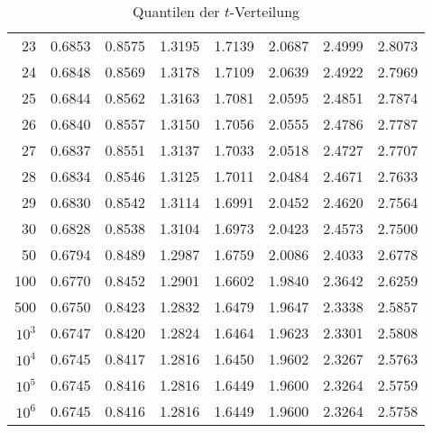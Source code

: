 \begin{table}[h]
\begin{center}
\begin{tabular}{|r|rrrrrrr|}
23&0.6853&0.8575&1.3195&1.7139&2.0687&2.4999&2.8073\\
24&0.6848&0.8569&1.3178&1.7109&2.0639&2.4922&2.7969\\
25&0.6844&0.8562&1.3163&1.7081&2.0595&2.4851&2.7874\\
26&0.6840&0.8557&1.3150&1.7056&2.0555&2.4786&2.7787\\
27&0.6837&0.8551&1.3137&1.7033&2.0518&2.4727&2.7707\\
28&0.6834&0.8546&1.3125&1.7011&2.0484&2.4671&2.7633\\
29&0.6830&0.8542&1.3114&1.6991&2.0452&2.4620&2.7564\\
30&0.6828&0.8538&1.3104&1.6973&2.0423&2.4573&2.7500\\
50&0.6794&0.8489&1.2987&1.6759&2.0086&2.4033&2.6778\\
100&0.6770&0.8452&1.2901&1.6602&1.9840&2.3642&2.6259\\
500&0.6750&0.8423&1.2832&1.6479&1.9647&2.3338&2.5857\\
$10^3$&0.6747&0.8420&1.2824&1.6464&1.9623&2.3301&2.5808\\
$10^4$&0.6745&0.8417&1.2816&1.6450&1.9602&2.3267&2.5763\\
$10^5$&0.6745&0.8416&1.2816&1.6449&1.9600&2.3264&2.5759\\
$10^6$&0.6745&0.8416&1.2816&1.6449&1.9600&2.3264&2.5758\\
\hline
\end{tabular}
\end{center}
\caption{Quantilen der $t$-Verteilung\label{tabelle-tverteilung}
}
\end{table}

